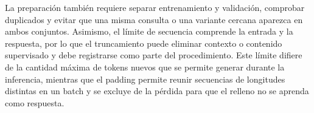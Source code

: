 La preparación también requiere separar entrenamiento y validación, comprobar duplicados y evitar que una misma consulta o una variante cercana aparezca en ambos conjuntos. Asimismo, el límite de secuencia comprende la entrada y la respuesta, por lo que el truncamiento puede eliminar contexto o contenido supervisado y debe registrarse como parte del procedimiento. Este límite difiere de la cantidad máxima de tokens nuevos que se permite generar durante la inferencia, mientras que el padding permite reunir secuencias de longitudes distintas en un batch y se excluye de la pérdida para que el relleno no se aprenda como respuesta.

